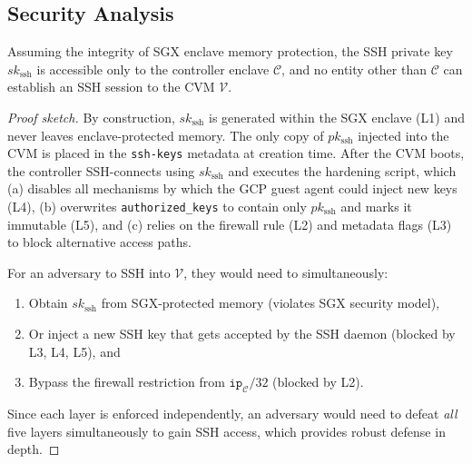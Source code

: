 \subsection{Security Analysis}
\label{sec:commissioning:security}

\begin{theorem}
Assuming the integrity of SGX enclave memory protection, the SSH private key $sk_{\text{ssh}}$ is accessible only to the controller enclave $\mathcal{C}$, and no entity other than $\mathcal{C}$ can establish an SSH session to the CVM $\mathcal{V}$.
\end{theorem}

\begin{proof}[Proof sketch]
By construction, $sk_{\text{ssh}}$ is generated within the SGX enclave (L1) and never leaves enclave-protected memory. The only copy of $pk_{\text{ssh}}$ injected into the CVM is placed in the \texttt{ssh-keys} metadata at creation time. After the CVM boots, the controller SSH-connects using $sk_{\text{ssh}}$ and executes the hardening script, which (a) disables all mechanisms by which the GCP guest agent could inject new keys (L4), (b) overwrites \texttt{authorized\_keys} to contain only $pk_{\text{ssh}}$ and marks it immutable (L5), and (c) relies on the firewall rule (L2) and metadata flags (L3) to block alternative access paths.

For an adversary to SSH into $\mathcal{V}$, they would need to simultaneously:
\begin{enumerate}
    \item Obtain $sk_{\text{ssh}}$ from SGX-protected memory (violates SGX security model),
    \item Or inject a new SSH key that gets accepted by the SSH daemon (blocked by L3, L4, L5), and
    \item Bypass the firewall restriction from $\texttt{ip}_\mathcal{C}/32$ (blocked by L2).
\end{enumerate}

Since each layer is enforced independently, an adversary would need to defeat \emph{all} five layers simultaneously to gain SSH access, which provides robust defense in depth.
\end{proof}

